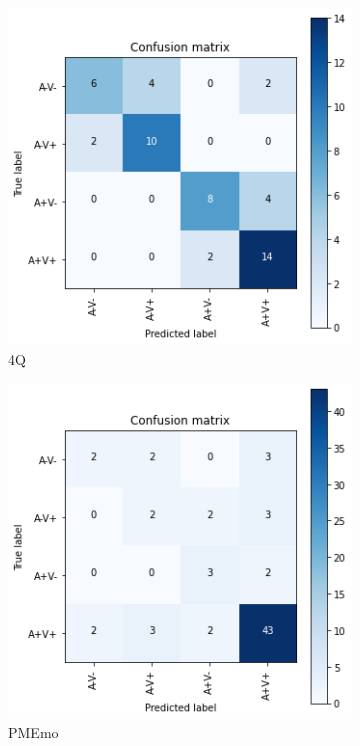\documentclass[11pt]{report}
\begin{document}
\newpage



\begin{figure}[h]
\centering
	\begin{subfigure}[t]{.5\textwidth}
	\centering
    \includegraphics[scale = 0.6]{img/es3-4Q.png}
    \caption{4Q}
    \label{fig:es3A}
	\end{subfigure}
	\quad
	\begin{subfigure}[t]{.5\textwidth}
	\centering
    \includegraphics[scale = 0.6]{img/es3-PMEmo.png}
    \caption{PMEmo}
    \label{fig:es3B}
	\end{subfigure}
	\quad
	\begin{subfigure}[t]{.5\textwidth}
	\centering

\end{subfigure}
\end{figure}
\end{document}
